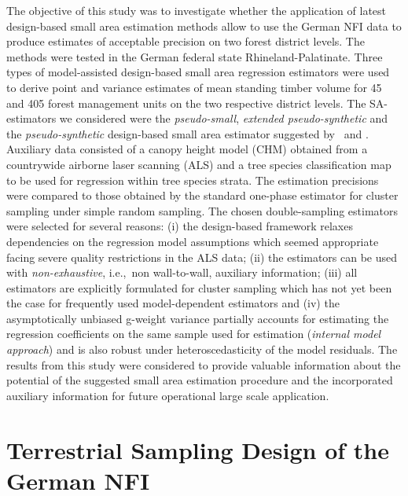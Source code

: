 \documentclass[remotesensing,article,accept,moreauthors,pdftex,10pt,a4paper]{Definitions/mdpi}
\begin{document}
The objective of this study was to investigate whether the application of latest design-based small area estimation methods allow to use the German NFI data to produce estimates of acceptable precision on two forest district levels. The methods were tested in the German federal state Rhineland-Palatinate. Three types of model-assisted design-based small area regression estimators were used to derive point and variance estimates of mean standing timber volume for 45 and 405 forest management units on the two respective district levels. The SA-estimators we considered were the \textit{pseudo-small}, \textit{extended pseudo-synthetic} and the \textit{pseudo-synthetic} design-based small area estimator suggested \mbox{by \citet{mandallaz2013a}} and \citet{ mandallaz2013b}. Auxiliary data consisted of a canopy height model (CHM) obtained from a countrywide airborne laser scanning (ALS) and a tree species classification map to be used for regression within tree species strata. The estimation precisions were compared to those obtained by the standard one-phase estimator for cluster sampling under simple random sampling. The chosen double-sampling estimators were selected for several reasons: {(i)} the design-based framework relaxes dependencies on the regression model assumptions which seemed appropriate facing severe quality restrictions in the ALS data; {(ii)} the estimators can be used with \textit{non-exhaustive}, i.e.,~non wall-to-wall, auxiliary information; {(iii)} all estimators are explicitly formulated for cluster sampling which has not yet been the case for frequently used model-dependent estimators and {(iv)} the asymptotically unbiased g-weight variance partially accounts for estimating the regression coefficients on the same sample used for estimation (\textit{internal model approach}) and is also robust under heteroscedasticity of the model residuals. The results from this study were considered to provide valuable information about the potential of the suggested small area estimation procedure and the incorporated auxiliary information for future operational large scale application.\par


\section{Terrestrial Sampling Design of the German NFI}
\label{sec:germanNFI}
\end{document}
